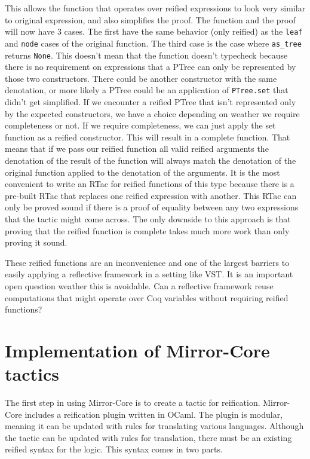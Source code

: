 \documentclass{puthesis}
\begin{document}
This allows the function that operates over reified expressions to look very
similar to original expression, and also simplifies the proof. The function
and the proof will now have 3 cases. The first have the same behavior (only reified)
as the \lstinline|leaf| and \lstinline|node| cases of the original function. The third
case is the case where \lstinline|as_tree| returns \lstinline|None|. This doesn't
mean that the function doesn't typecheck because there is no requirement on 
expressions that a PTree can only be represented by those two constructors. There
could be another constructor with the same denotation, or more likely a PTree
could be an application of \lstinline|PTree.set| that didn't get simplified.
If we encounter a reified PTree that isn't represented
only by the expected constructors, we have a choice depending on
weather we require completeness or not. If we require completeness,
we can just apply the set function as a reified constructor. This
will result in a complete function. That means that if we
pass our reified function all valid reified arguments
the denotation of the result of the function will always
match the denotation of the original function applied
to the denotation of the arguments. It is the most convenient
to write an RTac for reified functions of this type because
there is a pre-built RTac that replaces one reified expression
with another. This RTac can only be proved sound if there is a proof
of equality between any two expressions that the tactic might come
across. The only downside to this approach is that proving that the
reified function is complete takes much more work than only proving it
sound. 

These reified functions are an inconvenience and one of the largest
barriers to easily applying a reflective framework in a setting like
VST. It is an important open question weather this is avoidable. Can
a reflective framework reuse computations that might operate
over Coq variables without requiring reified functions? 

\section{Implementation of Mirror-Core tactics}
The first step in using Mirror-Core is to create a tactic for
reification. Mirror-Core includes a reification plugin written in
OCaml. The plugin is modular, meaning it can be updated with rules for
translating various languages. Although the tactic can be updated with
rules for translation, there must be an existing reified syntax for
the logic. This syntax comes in two parts.
\end{document}
